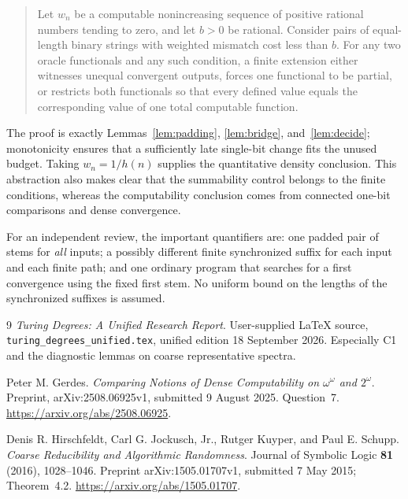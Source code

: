 \documentclass[11pt,a4paper]{article}
\theoremstyle{definition}
\theoremstyle{remark}
\begin{document}
\begin{quote}
Let $w_n$ be a computable nonincreasing sequence of positive rational numbers tending to zero, and let $b>0$ be rational. Consider pairs of equal-length binary strings with weighted mismatch cost less than $b$. For any two oracle functionals and any such condition, a finite extension either witnesses unequal convergent outputs, forces one functional to be partial, or restricts both functionals so that every defined value equals the corresponding value of one total computable function.
\end{quote}

The proof is exactly Lemmas~\ref{lem:padding}, \ref{lem:bridge}, and~\ref{lem:decide}; monotonicity ensures that a sufficiently late single-bit change fits the unused budget. Taking $w_n=1/h(n)$ supplies the quantitative density conclusion. This abstraction also makes clear that the summability control belongs to the finite conditions, whereas the computability conclusion comes from connected one-bit comparisons and dense convergence.

For an independent review, the important quantifiers are: one padded pair of stems for \emph{all} inputs; a possibly different finite synchronized suffix for each input and each finite path; and one ordinary program that searches for a first convergence using the fixed first stem. No uniform bound on the lengths of the synchronized suffixes is assumed.

{\raggedright
\begin{thebibliography}{9}
\emph{Turing Degrees: A Unified Research Report}.
User-supplied LaTeX source, \texttt{turing\_degrees\_unified.tex}, unified edition 18 September 2026. Especially C1 and the diagnostic lemmas on coarse representative spectra.

Peter M. Gerdes.
\emph{Comparing Notions of Dense Computability on $\omega^\omega$ and $2^\omega$}.
Preprint, arXiv:2508.06925v1, submitted 9 August 2025. Question~7.
\url{https://arxiv.org/abs/2508.06925}.

Denis R. Hirschfeldt, Carl G. Jockusch, Jr., Rutger Kuyper, and Paul E. Schupp.
\emph{Coarse Reducibility and Algorithmic Randomness}.
Journal of Symbolic Logic \textbf{81} (2016), 1028--1046.
Preprint arXiv:1505.01707v1, submitted 7 May 2015; Theorem~4.2.
\url{https://arxiv.org/abs/1505.01707}.
\end{thebibliography}
}
\end{document}
